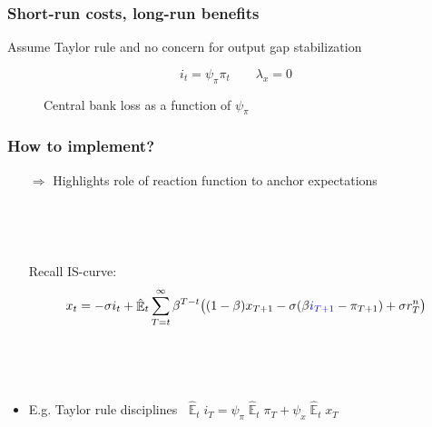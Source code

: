 \documentclass[11pt]{beamer}
\def \myFigPath {../../figures/}
\DeclareMathOperator{\E}{\mathbb{E}}
\begin{document}
\begin{frame}
	\frametitle{Short-run costs, long-run benefits}
	\label{SRLRtradeoffs}
Assume Taylor rule and no concern for output gap stabilization	
	
\begin{equation*}
i_t = \psi_{\pi}\pi_t  \quad \quad \lambda_x = 0 
\end{equation*}

\begin{figure}[h!]
\caption{Central bank loss as a function of $\psi_{\pi}$}
\label{fig_loss}
\end{figure}	
	
\hfill \hyperlink{SRcosts}{}

\end{frame}


\begin{frame}
	\frametitle{How to implement?}
	
	\begin{itemize}
	\item[$\Rightarrow$] Highlights role of reaction function to anchor expectations
	
	\
	
	\
	
	\item[] Recall IS-curve:
	\begin{equation*}
	x_t =  -\sigma i_t +\hat{\E}_t \sum_{T=t}^{\infty} \beta^{T-t }\big( (1-\beta)x_{T+1} - \sigma(\beta \textcolor{blue}{i_{T+1}} - \pi_{T+1}) +\sigma r_T^n \big) 
	\end{equation*}
	
	\
	
	\
	
	\item E.g. Taylor rule disciplines $\; \hat{\E}_t i_T = \psi_{\pi}\hat{\E}_t\pi_{T}+\psi_{x}\hat{\E}_tx_{T}$
	\end{itemize}


\end{frame}
\end{document}
